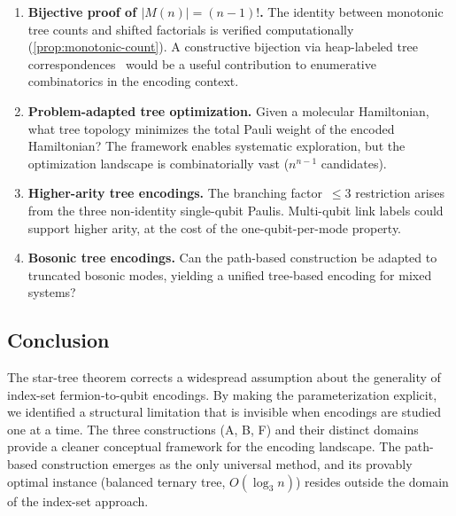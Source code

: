 \begin{enumerate}
  \item \textbf{Bijective proof of $|M(n)| = (n{-}1)!$.}
    The identity between monotonic tree counts and shifted factorials
    is verified computationally (\cref{prop:monotonic-count}).  A
    constructive bijection via heap-labeled tree
    correspondences~\cite{bergeron1992} would be a useful
    contribution to enumerative combinatorics in the encoding context.

  \item \textbf{Problem-adapted tree optimization.}
    Given a molecular Hamiltonian, what tree topology minimizes the
    total Pauli weight of the encoded Hamiltonian?  The framework
    enables systematic exploration, but the optimization landscape
    is combinatorially vast ($n^{n-1}$ candidates).

  \item \textbf{Higher-arity tree encodings.}
    The branching factor~$\le 3$ restriction arises from the three
    non-identity single-qubit Paulis.  Multi-qubit link labels could
    support higher arity, at the cost of the one-qubit-per-mode
    property.

  \item \textbf{Bosonic tree encodings.}
    Can the path-based construction be adapted to truncated bosonic
    modes, yielding a unified tree-based encoding for mixed systems?
\end{enumerate}

\subsection{Conclusion}

The star-tree theorem corrects a widespread assumption about the
generality of index-set fermion-to-qubit encodings.  By making the
parameterization explicit, we identified a structural limitation that
is invisible when encodings are studied one at a time.  The three
constructions (A, B, F) and their distinct domains provide a cleaner
conceptual framework for the encoding landscape.  The path-based
construction emerges as the only universal method, and its provably
optimal instance (balanced ternary tree, $O(\log_3 n)$) resides
outside the domain of the index-set approach.
